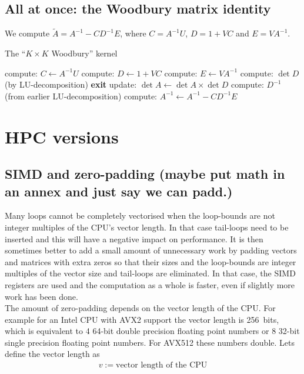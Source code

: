 \documentclass[11pt]{article}
\numberwithin{figure}{section}
\numberwithin{table}{section}
\begin{document}
			\subsection{All at once: the Woodbury matrix identity}
				We compute $\widetilde{A}=A^{-1}-CD^{-1}E$, where $C=A^{-1}U$, $D=1+VC$ and $E=VA^{-1}$.
			
				\begin{algorithm}[H]
				\caption{The ``$K\times K$ Woodbury'' kernel}\label{algo:woodbury}
 					compute: $C \gets A^{-1} U$\;
 					compute: $D \gets 1 + V C$\;
 					compute: $E \gets V A^{-1}$\;
 					compute: $\det D$ (by LU-decomposition)\;
					{
						\textbf{exit}\;
					}
					update: $\det A \gets \det A\times\det D$\;
					compute: $D^{-1}$ (from earlier LU-decomposition)\;
					compute: $A^{-1} \gets A^{-1}-CD^{-1}E$\;
				\end{algorithm}
		
		\section{HPC versions}
		
		    
		    
			\subsection{SIMD and zero-padding (maybe put math in an annex and just say we can padd.)}
				Many loops cannot be completely vectorised when the loop-bounds are not integer multiples of the CPU's vector length. In that case tail-loops need to be inserted and this will have a negative impact on performance. It is then sometimes better to add a small amount of unnecessary work by padding vectors and matrices with extra zeros so that their sizes and the loop-bounds are integer multiples of the vector size and tail-loops are eliminated. In that case, the SIMD registers are used and the computation as a whole is faster, even if slightly more work has been done.\\
				
				The amount of zero-padding depends on the vector length of the CPU. For example for an Intel CPU with AVX2 support the vector length is 256~bits, which is equivalent to 4 64-bit double precision floating point numbers or 8 32-bit single precision floating point numbers. For AVX512 these numbers double. Lets define the vector length as 
\begin{align}
	v := \text{vector length of the CPU}
\end{align}
\end{document}
